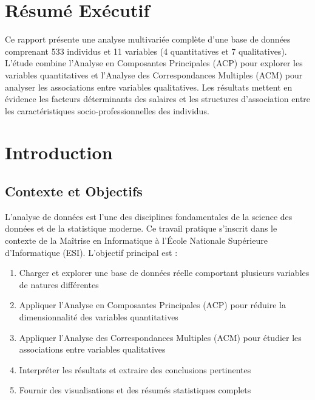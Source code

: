 \documentclass[12pt,a4paper]{report}
\begin{document}
\newpage

\section*{Résumé Exécutif}

Ce rapport présente une analyse multivariée complète d'une base de données comprenant 533 individus et 11 variables (4 quantitatives et 7 qualitatives). L'étude combine l'Analyse en Composantes Principales (ACP) pour explorer les variables quantitatives et l'Analyse des Correspondances Multiples (ACM) pour analyser les associations entre variables qualitatives. Les résultats mettent en évidence les facteurs déterminants des salaires et les structures d'association entre les caractéristiques socio-professionnelles des individus.

\tableofcontents

\newpage

\section{Introduction}

\subsection{Contexte et Objectifs}

L'analyse de données est l'une des disciplines fondamentales de la science des données et de la statistique moderne. Ce travail pratique s'inscrit dans le contexte de la Maîtrise en Informatique à l'École Nationale Supérieure d'Informatique (ESI). L'objectif principal est :

\begin{enumerate}
    \item Charger et explorer une base de données réelle comportant plusieurs variables de natures différentes
    \item Appliquer l'Analyse en Composantes Principales (ACP) pour réduire la dimensionnalité des variables quantitatives
    \item Appliquer l'Analyse des Correspondances Multiples (ACM) pour étudier les associations entre variables qualitatives
    \item Interpréter les résultats et extraire des conclusions pertinentes
    \item Fournir des visualisations et des résumés statistiques complets
\end{enumerate}
\end{document}
